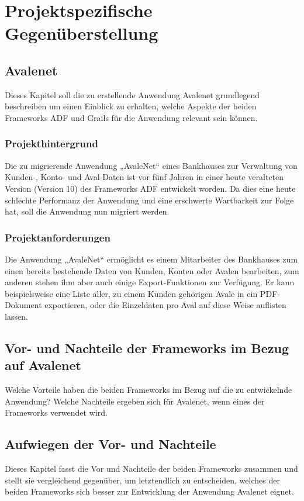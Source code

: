 \section{Projektspezifische Gegenüberstellung}
\subsection{Avalenet}
Dieses Kapitel soll die zu erstellende Anwendung Avalenet grundlegend beschreiben um einen Einblick zu erhalten, welche Aspekte der beiden Frameworks ADF und Grails für die Anwendung relevant sein können.
\subsubsection{Projekthintergrund}
Die zu migrierende Anwendung „AvaleNet“ eines Bankhauses zur Verwaltung von Kunden-, Konto- und Aval-Daten ist vor fünf Jahren in einer heute veralteten Version (Version 10) des Frameworks ADF entwickelt worden. Da dies eine heute schlechte Performanz der Anwendung und eine erschwerte Wartbarkeit zur Folge hat, soll die Anwendung nun migriert werden.
\subsubsection{Projektanforderungen}
Die Anwendung „AvaleNet“ ermöglicht es einem Mitarbeiter des Bankhauses zum einen bereits bestehende Daten von Kunden, Konten oder Avalen bearbeiten, zum anderen stehen ihm aber auch einige Export-Funktionen zur Verfügung. Er kann beispielsweise eine Liste aller, zu einem Kunden gehörigen Avale in ein PDF-Dokument exportieren, oder die Einzeldaten pro Aval auf diese Weise auflisten lassen.


\subsection{Vor- und Nachteile der Frameworks im Bezug auf Avalenet}
Welche Vorteile haben die beiden Frameworks im Bezug auf die zu entwickelnde Anwendung?
Welche Nachteile ergeben sich für Avalenet, wenn eines der Frameworks verwendet wird.
\subsection{Aufwiegen der Vor- und Nachteile}
Dieses Kapitel fasst die Vor und Nachteile der beiden Frameworks zusammen und stellt sie vergleichend gegenüber, um letztendlich zu entscheiden, welches der beiden Frameworks sich besser zur Entwicklung der Anwendung Avalenet eignet.